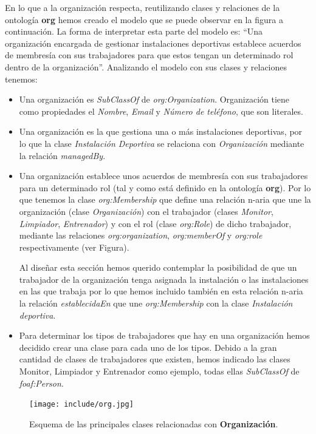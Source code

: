 \documentclass[a4paper,12pt]{article}
\begin{document}
	En lo que a la organización respecta, reutilizando clases y relaciones de la ontología \textbf{org} hemos creado el modelo que se puede observar en la figura a continuación. La forma de interpretar esta parte del modelo es: “Una organización encargada de gestionar instalaciones deportivas establece acuerdos de membresía con sus trabajadores para que estos tengan un determinado rol dentro de la organización”. Analizando el modelo con sus clases y relaciones tenemos:
	
	\begin{itemize}
		\item Una organización es \textit{SubClassOf} de \textit{org:Organization}. Organización tiene como propiedades el \textit{Nombre}, \textit{Email} y \textit{Número de teléfono}, que son literales.
		\item Una organización es la que gestiona una o más instalaciones deportivas, por lo que la clase \textit{Instalación Deportiva} se relaciona con \textit{Organización} mediante la relación \textit{managedBy}.
		
		\item Una organización establece unos acuerdos de membresía con sus trabajadores para un determinado rol (tal y como está definido en la ontología \textbf{org}). Por lo que tenemos la clase \textit{org:Membership} que define una relación n-aria que une la organización (clase \textit{Organización}) con el trabajador (clases \textit{Monitor}, \textit{Limpiador}, \textit{Entrenador}) y con el rol (clase \textit{org:Role}) de dicho trabajador, mediante las relaciones \textit{org:organization}, \textit{org:memberOf} y \textit{org:role} respectivamente (ver Figura). 
		
		Al diseñar esta sección hemos querido contemplar la posibilidad de que un trabajador de la organización tenga asignada la instalación o las instalaciones en las que trabaja por lo que hemos incluido también en esta relación n-aria la relación \textit{establecidaEn} que une \textit{org:Membership} con la clase \textit{Instalación deportiva}.
		\item Para determinar los tipos de trabajadores que hay en una organización hemos decidido crear una clase para cada uno de los tipos. Debido a la gran cantidad de clases de trabajadores que existen, hemos indicado las clases Monitor, Limpiador y Entrenador como ejemplo, todas ellas \textit{SubClassOf} de \textit{foaf:Person}.
	\end{itemize}

	\begin{figure}[H]
		\centering
		\texttt{[image: include/org.jpg]}
		\caption{Esquema de las principales clases relacionadas con \textbf{Organización}.}
	\end{figure}
	
\end{document}
